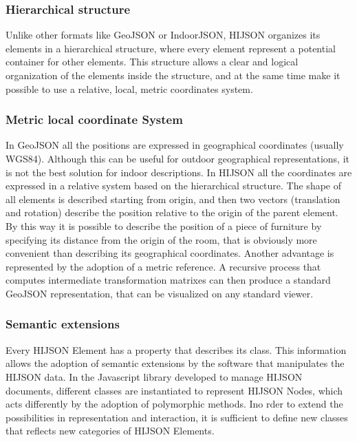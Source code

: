 \documentclass{sig-alternate}
\begin{document}
\subsubsection{Hierarchical structure}\label{hierarchical-structure}

Unlike other formats like GeoJSON or IndoorJSON, HIJSON organizes its
elements in a hierarchical structure, where every element represent a
potential container for other elements. This structure allows a clear
and logical organization of the elements inside the structure, and at
the same time make it possible to use a relative, local, metric
coordinates system.

\subsubsection{Metric local coordinate System}\label{metric-local-coordinate-system}

In GeoJSON all the positions are expressed in geographical coordinates
(usually WGS84). Although this can be useful for outdoor geographical
representations, it is not the best solution for indoor descriptions. In
HIJSON all the coordinates are expressed in a relative system based on
the hierarchical structure. The shape of all elements is described
starting from origin, and then two vectors (translation and rotation)
describe the position relative to the origin of the parent element. By
this way it is possible to describe the position of a piece of furniture
by specifying its distance from the origin of the room, that is
obviously more convenient than describing its geographical coordinates.
Another advantage is represented by the adoption of a metric reference.
A recursive process that computes intermediate transformation matrixes
can then produce a standard GeoJSON representation, that can be
visualized on any standard viewer.

\subsubsection{Semantic extensions}\label{semantic-extensions}

Every HIJSON Element has a property that describes its class. This
information allows the adoption of semantic extensions by the software
that manipulates the HIJSON data. In the Javascript library developed to
manage HIJSON documents, different classes are instantiated to represent
HIJSON Nodes, which acts differently by the adoption of polymorphic
methods. Ino rder to extend the possibilities in representation and
interaction, it is sufficient to define new classes that reflects new
categories of HIJSON Elements.
\end{document}
